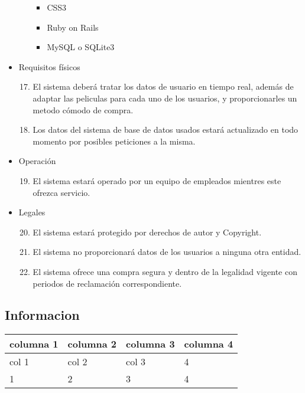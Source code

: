 \documentclass{article}
\begin{document}
\begin{itemize}
\begin{enumerate}[label=\bfseries RN- \arabic*:]
\begin{itemize}
            \item CSS3
            \item Ruby on Rails
            \item MySQL o SQLite3
            \end{itemize}
        \end{enumerate}
    \item Requisitos físicos
        \begin{enumerate}[label=\bfseries RN- \arabic*:]
        \setcounter{enumi}{16}
        \item El sistema deberá tratar los datos de usuario en tiempo real, además de adaptar las peliculas para cada uno de los usuarios, y proporcionarles un metodo cómodo de compra.
        \item Los datos del sistema de base de datos usados estará actualizado en todo momento por posibles peticiones a la misma.
        \end{enumerate}
    \item Operación
        \begin{enumerate}[label=\bfseries RN- \arabic*:]
        \setcounter{enumi}{18}
        \item El sistema estará operado por un equipo de empleados mientres este ofrezca servicio.
        \end{enumerate}
    \item Legales
        \begin{enumerate}[label=\bfseries RN- \arabic*:]
        \setcounter{enumi}{19}
        \item El sistema estará protegido por derechos de autor y Copyright.
        \item El sistema no proporcionará datos de los usuarios a ninguna otra entidad.
        \item El sistema ofrece una compra segura y dentro de la legalidad vigente con periodos de reclamación correspondiente.
        \end{enumerate}
    \end{itemize}
    \subsection{Informacion}




\begin{tabular}{||l | l | l | l ||}
\hline
\hline
columna 1 & columna 2 & columna 3 & columna 4\\
\hline
col 1 & col 2 & col 3 & 4\\
\hline
1 & 2 & 3 & 4\\
\hline
\hline
\end{tabular}
\end{document}
